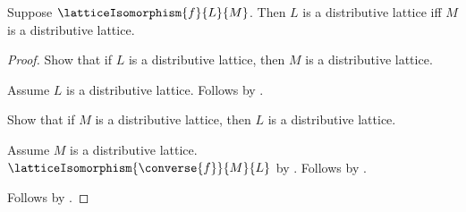 \begin{theorem}\label{lattice_isomorphism_distributive_iff}
    Suppose $\latticeIsomorphism{f}{L}{M}$.
    Then $L$ is a distributive lattice iff
        $M$ is a distributive lattice.
\end{theorem}
\begin{proof}
    Show that if $L$ is a distributive lattice, then
        $M$ is a distributive lattice.
    \begin{subproof}
        Assume $L$ is a distributive lattice.
        Follows by
            .
    \end{subproof}
    Show that if $M$ is a distributive lattice, then
        $L$ is a distributive lattice.
    \begin{subproof}
        Assume $M$ is a distributive lattice.
        $\latticeIsomorphism{\converse{f}}{M}{L}$ by
            .
        Follows by
            .
    \end{subproof}
    Follows by \auto.
\end{proof}
